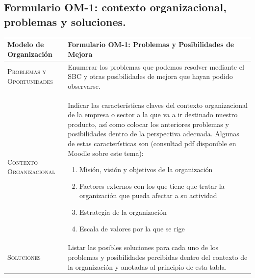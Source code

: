\documentclass[12pt,a4paper,twoside,spanish]{article}      %
\begin{document}
        \subsection{Formulario OM-1: contexto organizacional, problemas y soluciones.}

        
            \begin{table}[H]
                \scriptsize
                \begin{tabularx}{\textwidth}{|l|X|} \hline
                    \textbf{Modelo de Organización} & \textbf{Formulario OM-1: Problemas y Posibilidades de Mejora} \\ \hline\hline
                    
                    \textsc{Problemas y Oportunidades} & Enumerar los problemas que podemos resolver mediante el SBC y otras posibilidades de mejora que hayan podido observarse.  \\ \hline
                    
                    \textsc{Contexto Organizacional} & Indicar las características claves del contexto organizacional de la empresa o sector a la que va a ir destinado nuestro producto, así como colocar los anteriores problemas y posibilidades dentro de la perspectiva adecuada. Algunas de estas características son (consultad pdf disponible en Moodle sobre este tema):
                     
                    \begin{enumerate}
                        \item Misión, visión y objetivos de la organización 
                        \item Factores externos con los que tiene que tratar la organización que pueda afectar a su actividad
                        \item Estrategia de la organización
                        \item Escala de valores por la que se rige
                    \end{enumerate}    \\ \hline
                    
                    \textsc{Soluciones} & Listar las posibles soluciones para cada uno de los problemas y posibilidades percibidas
                    dentro del contexto de la organización y anotadas al principio de esta tabla. \\ \hline
                    
                \end{tabularx}
                  \label{tab.OM1}
            \end{table}
            
\end{document}
